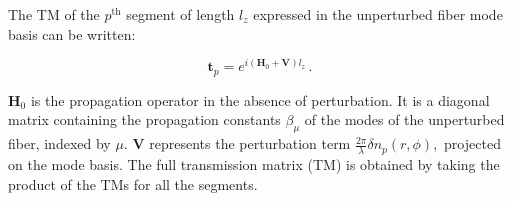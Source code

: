 \documentclass[aps,prl,twocolumn, amsmath,amssymb,superscriptaddress]{revtex4-2}
\newcommand{\red}[1]{\textcolor{red}{#1}}
\begin{document}



The TM of the $p^\text{th}$ segment of length $l_z$
expressed in the unperturbed fiber mode basis
can be written:

\begin{equation}
    \mathbf{t}_p = e^{i \left(
                            \mathbf{H}_0 + \mathbf{V}
                        \right) l_z
                     } 
    \, .
    \label{eq:hamiltonian}
\end{equation}



 
$\mathbf{H}_0$ is the propagation operator in the absence of perturbation. 
It is a diagonal matrix containing the propagation constants $\beta_\mu$ 
of the modes of the unperturbed fiber, indexed by $\mu$. 
$\mathbf{V}$ represents the perturbation term 
$
\frac{2\pi}{\lambda}\delta n_p(r,\phi),
$
projected on the mode basis. The full transmission matrix (TM) is obtained by taking the product of the TMs for all the segments.
\end{document}
